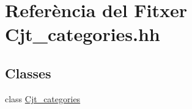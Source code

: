 \hypertarget{_cjt__categories_8hh}{}\section{Referència del Fitxer Cjt\+\_\+categories.\+hh}
\label{_cjt__categories_8hh}
\subsection*{Classes}
\begin{DoxyCompactItemize}
\item 
class \mbox{\hyperlink{class_cjt__categories}{Cjt\+\_\+categories}}
\end{DoxyCompactItemize}
